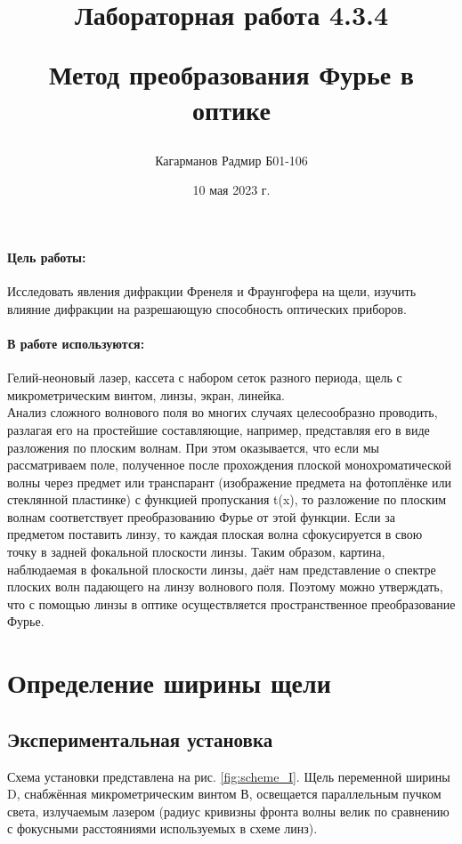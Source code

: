\documentclass[a4paper,12pt]{article}
\title{Лабораторная работа 4.3.4

Метод преобразования Фурье в оптике}
\author{Кагарманов Радмир Б01-106}
\date{10 мая 2023 г.}
\begin{document}
\maketitle
\thispagestyle{empty}
\newpage
\setcounter{page}{1}

\paragraph*{Цель работы:} Исследовать явления дифракции Френеля и Фраунгофера на щели, изучить влияние дифракции на разрешающую способность оптических приборов.
\paragraph*{В работе используются:} Гелий-неоновый лазер, кассета с набором
сеток разного периода, щель с микрометрическим винтом, линзы,
экран, линейка.
$$$$
Анализ сложного волнового поля во многих случаях целесообразно проводить, разлагая его на простейшие составляющие, например, представляя его в виде разложения по плоским волнам. При этом оказывается, что если мы рассматриваем поле, полученное после прохождения плоской монохроматической волны через предмет или транспарант (изображение предмета на фотоплёнке или стеклянной пластинке) с функцией пропускания t(x), то разложение по плоским волнам соответствует преобразованию Фурье от этой функции. Если за предметом поставить линзу, то каждая плоская волна сфокусируется в свою точку в задней фокальной плоскости линзы. Таким образом, картина, наблюдаемая в фокальной плоскости линзы, даёт нам представление о спектре плоских волн падающего на линзу волнового поля. Поэтому можно утверждать, что с помощью линзы в оптике осуществляется пространственное преобразование Фурье.

\section*{Определение ширины щели}
\label{section_I}
\subsection*{Экспериментальная установка}

Схема установки представлена на рис. \ref{fig:scheme_I}. Щель переменной ширины D, снабжённая микрометрическим винтом В, освещается параллельным пучком света, излучаемым лазером (радиус кривизны фронта волны велик по сравнению с фокусными расстояниями используемых в схеме линз).
\end{document}
